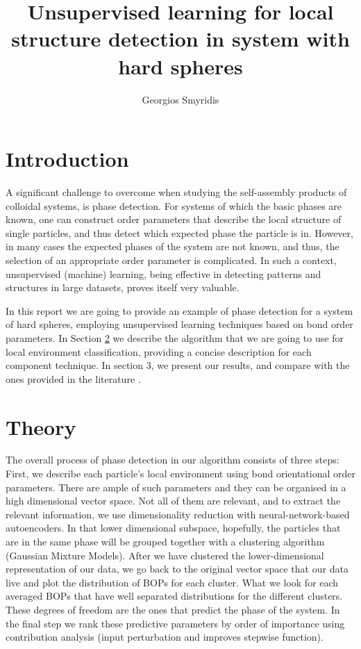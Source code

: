 \documentclass{article}
\title{Unsupervised learning for local structure detection in system with hard spheres}
\author{Georgios Smyridis}
\date{}
\begin{document}
\maketitle



\section{Introduction}

A significant challenge to overcome when studying the self-assembly products of colloidal systems, is phase detection. For systems of which the basic phases are known, one can construct order parameters that describe the local structure of single particles, and thus detect which expected phase the particle is in. 
However, in many cases the expected phases of the system are not known, and thus, the selection of an appropriate order parameter is complicated. 
In such a context, unsupervised (machine) learning, being effective in detecting patterns and structures in large datasets, proves itself very valuable.

In this report we are going to provide an example of phase detection for a system of hard spheres, employing unsupervised learning techniques based on bond order parameters.
In Section \ref{theory} we describe the algorithm that we are going to use for local environment classification, providing a concise description for each component technique. 
In section 3, we present our results, and compare with the ones provided in the literature \cite{main}.


\section{Theory}\label{theory}

The overall process of phase detection in our algorithm consists of three steps: First, we describe each particle's local environment using bond orientational order parameters. There are ample of such parameters and they can be organised in a high dimensional vector space. Not all of them are relevant, and to extract the relevant information, we use dimensionality reduction with neural-network-based autoencoders. In that lower dimensional subspace, hopefully, the particles that are in the same phase will be grouped together with a clustering algorithm (Gaussian Mixture Models). After we have clustered the lower-dimensional representation of our data, we go back to the original vector space that our data live and plot the distribution of BOPs for each cluster. What we look for each averaged BOPs that have well separated distributions for the different clusters. These degrees of freedom are the ones that predict the phase of the system. In the final step we rank these predictive parameters by order of importance using contribution analysis (input perturbation and improves stepwise function).
\end{document}

